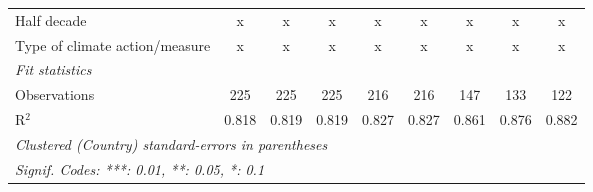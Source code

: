 \begin{tabular}{lcccccccc}
   Half decade                                                  & x             & x             & x             & x             & x             & x              & x              & x\\  
   Type of climate action/measure                               & x             & x             & x             & x             & x             & x              & x              & x\\  
   \midrule \emph{Fit statistics}\\
   Observations                                                 & 225           & 225           & 225           & 216           & 216           & 147            & 133            & 122\\  
   R$^2$                                                        & 0.818         & 0.819         & 0.819         & 0.827         & 0.827         & 0.861          & 0.876          & 0.882\\  
   \midrule
   \multicolumn{9}{l}{\emph{Clustered (Country) standard-errors in parentheses}}\\
   \multicolumn{9}{l}{\emph{Signif. Codes: ***: 0.01, **: 0.05, *: 0.1}}\\
\end{tabular}
\par\endgroup


